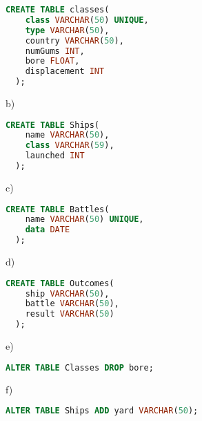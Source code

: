 \documentclass[../../main.tex]{subfiles}
\begin{document}
\begin{lstlisting}[language=sql]
  CREATE TABLE classes(
    class VARCHAR(50) UNIQUE,
    type VARCHAR(50),
    country VARCHAR(50),
    numGums INT,
    bore FLOAT,
    displacement INT
  );
\end{lstlisting}

b)

\begin{lstlisting}[language=sql]
  CREATE TABLE Ships(
    name VARCHAR(50),
    class VARCHAR(59),
    launched INT
  );
\end{lstlisting}

c)

\begin{lstlisting}[language=sql]
  CREATE TABLE Battles(
    name VARCHAR(50) UNIQUE,
    data DATE
  );
\end{lstlisting}

d)

\begin{lstlisting}[language=sql]
  CREATE TABLE Outcomes(
    ship VARCHAR(50),
    battle VARCHAR(50),
    result VARCHAR(50)
  );
\end{lstlisting}

e)

\begin{lstlisting}[language=sql]
  ALTER TABLE Classes DROP bore;
\end{lstlisting}

f)

\begin{lstlisting}[language=sql]
  ALTER TABLE Ships ADD yard VARCHAR(50);
\end{lstlisting}
\end{document}
